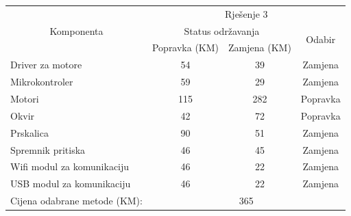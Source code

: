 \documentclass[12pt]{article}
\begin{document}
\begin{landscape}
\begin{table}[htbp]
        \begin{tabular}{lccc}
    \toprule
    \multicolumn{1}{c}{\multirow{3}[6]{*}{Komponenta}} & \multicolumn{3}{c}{Rješenje 3} \\
\cmidrule{2-4}          & \multicolumn{2}{c}{Status održavanja} & \multirow{2}[4]{*}{Odabir} \\
\cmidrule{2-3}          & Popravka (KM) & Zamjena (KM) &  \\
    \midrule
    Driver za motore & 54    & 39    & Zamjena \\
    Mikrokontroler & 59    & 29    & Zamjena \\
    \midrule
    Motori & 115   & 282   & Popravka \\
    Okvir & 42    & 72    & Popravka \\
    Prskalica & 90    & 51    & Zamjena \\
    Spremnik pritiska & 46    & 45    & Zamjena \\
    \midrule
    Wifi modul za komunikaciju & 46    & 22    & Zamjena \\
    USB modul za komunikaciju & 46    & 22    & Zamjena \\
    \midrule
    Cijena odabrane metode (KM): & \multicolumn{3}{c}{365} \\
    \bottomrule
    \end{tabular}%
  \label{tab:addlabel}%
\end{table}

\end{landscape}
\clearpage
\end{document}
